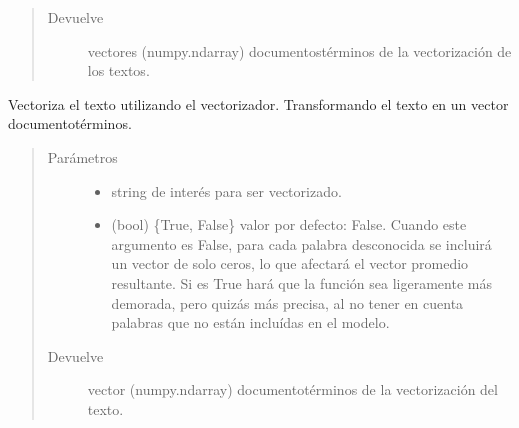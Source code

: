 \documentclass[letterpaper,10pt,openany,spanish]{sphinxmanual}
\begin{document}
\begin{fulllineitems}
\begin{fulllineitems}
\begin{quote}
\begin{description}
\begin{itemize}
\end{itemize}

\item[{Devuelve}] \leavevmode
vectores (numpy.ndarray) documentos\sphinxhyphen{}términos de la 
vectorización de los textos.

\end{description}\end{quote}

\end{fulllineitems}


\begin{fulllineitems}
\label{\detokenize{funciones/vectorizacion:vectorizacion.VectorizadorWord2Vec.vectorizar_texto}}
Vectoriza el texto utilizando el vectorizador. 
Transformando el texto en un vector documento\sphinxhyphen{}términos.
\begin{quote}\begin{description}
\item[{Parámetros}] \leavevmode\begin{itemize}
\item {} 
 \textendash{} string de interés para ser vectorizado.

\item {} 
 \textendash{} (bool) \{True, False\} valor por defecto: False. 
Cuando este argumento es False, para cada palabra desconocida 
se incluirá un vector de solo ceros, lo que afectará el vector 
promedio resultante. Si es True hará que la función sea 
ligeramente más demorada, pero quizás más precisa, al no tener 
en cuenta palabras que no están incluídas en el modelo.

\end{itemize}

\item[{Devuelve}] \leavevmode
vector (numpy.ndarray) documento\sphinxhyphen{}términos de la 
vectorización del texto.

\end{description}\end{quote}

\end{fulllineitems}


\end{fulllineitems}
\end{document}
